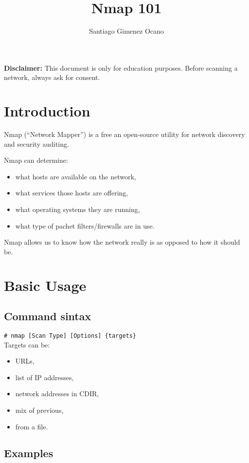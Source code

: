 \documentclass[twocolumn]{article}
\title{Nmap 101}
\author{Santiago Gimenez Ocano}
\date{}
\begin{document}
\maketitle

\textbf{Disclaimer:} This document is only for education purposes. Before scanning a network, always ask for consent.

\section{Introduction}
Nmap (``Network Mapper'') is a free an open-source utility for network discovery and security auditing.

Nmap can determine:

\begin{itemize}
    \item what hosts are available on the network,
    \item what services those hosts are offering,
    \item what operating systems they are running,
    \item what type of pachet filters/firewalls are in use.
\end{itemize}

Nmap allows us to know how the network really is as opposed to how it should be.

\section{Basic Usage}
\subsection{Command sintax}

\indent\texttt{\# nmap [Scan Type] [Options] \{targets\}}\\

Targets can be:

\begin{itemize}
    \item URLs,
    \item list of IP addresses,
    \item network addresses in CDIR,
    \item mix of previous,
    \item from a file.
\end{itemize}

\subsection{Examples}
\end{document}
